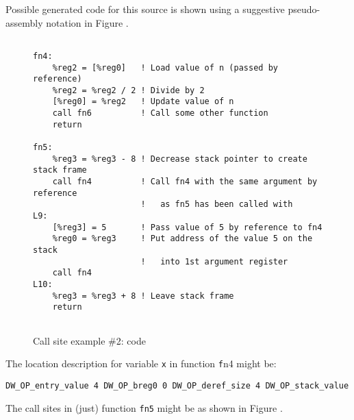 Possible generated code for this source is shown using a suggestive 
pseudo-\linebreak[0]assembly notation in Figure .
\begin{figure}[h]
\begin{lstlisting}

fn4:
    %reg2 = [%reg0]   ! Load value of n (passed by reference)
    %reg2 = %reg2 / 2 ! Divide by 2
    [%reg0] = %reg2   ! Update value of n
    call fn6          ! Call some other function
    return

fn5:
    %reg3 = %reg3 - 8 ! Decrease stack pointer to create stack frame
    call fn4          ! Call fn4 with the same argument by reference 
                      !   as fn5 has been called with
L9:
    [%reg3] = 5       ! Pass value of 5 by reference to fn4
    %reg0 = %reg3     ! Put address of the value 5 on the stack
                      !   into 1st argument register
    call fn4
L10:
    %reg3 = %reg3 + 8 ! Leave stack frame
    return
    
\end{lstlisting}
\caption{Call site example \#2: code}
\label{fig:callsiteexample2code}
\end{figure}

The location description for variable \texttt{x} in function 
\texttt{f}n4 might be:
\begin{lstlisting}
DW_OP_entry_value 4 DW_OP_breg0 0 DW_OP_deref_size 4 DW_OP_stack_value
\end{lstlisting}

The call sites in (just) function \texttt{fn5} might be as shown in 
Figure .

